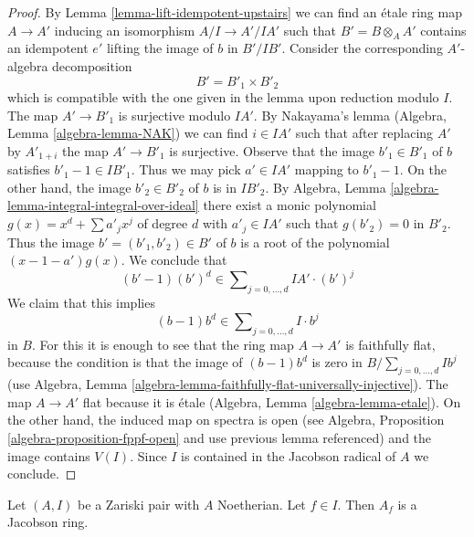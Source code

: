 \begin{proof}
By Lemma \ref{lemma-lift-idempotent-upstairs} we can find an
\'etale ring map $A \to A'$ inducing an isomorphism $A/I \to A'/IA'$
such that $B' = B \otimes_A A'$ contains
an idempotent $e'$ lifting the image of $b$ in $B'/IB'$.
Consider the corresponding $A'$-algebra decomposition
$$
B' = B'_1 \times B'_2
$$
which is compatible with the one given in the lemma upon
reduction modulo $I$.
The map $A' \to B'_1$ is surjective modulo $IA'$. By Nakayama's lemma
(Algebra, Lemma \ref{algebra-lemma-NAK})
we can find $i \in IA'$ such that after replacing $A'$
by $A'_{1 + i}$ the map $A' \to B'_1$ is surjective.
Observe that the image $b'_1 \in B'_1$ of $b$ 
satisfies $b'_1 - 1 \in IB'_1$.
Thus we may pick $a' \in IA'$ mapping to $b'_1 - 1$.
On the other hand, the image $b'_2 \in B'_2$ of $b$ is in $IB'_2$. By
Algebra, Lemma \ref{algebra-lemma-integral-integral-over-ideal}
there exist a monic polynomial
$g(x) = x^d + \sum a'_j x^j$ of degree $d$ with $a'_j \in IA'$ such that
$g(b'_2) = 0$ in $B'_2$. Thus the image $b' = (b'_1, b'_2) \in B'$
of $b$ is a root of the polynomial $(x - 1 - a')g(x)$. We conclude that
$$
(b' - 1)(b')^d \in \sum\nolimits_{j = 0, \ldots, d} IA' \cdot (b')^j
$$
We claim that this implies
$$
(b - 1)b^d \in \sum\nolimits_{j = 0, \ldots, d} I \cdot b^j
$$
in $B$. For this it is enough to see that the ring map
$A \to A'$ is faithfully flat, because the condition is that
the image of $(b - 1)b^d$ is zero in $B/\sum_{j = 0, \ldots, d} Ib^j$
(use Algebra, Lemma \ref{algebra-lemma-faithfully-flat-universally-injective}).
The map $A \to A'$ flat because it is \'etale
(Algebra, Lemma \ref{algebra-lemma-etale}).
On the other hand, the induced map on spectra is open
(see Algebra, Proposition \ref{algebra-proposition-fppf-open} and use
previous lemma referenced) and the image
contains $V(I)$. Since $I$ is contained in the Jacobson radical of $A$
we conclude.
\end{proof}

\begin{lemma}
\label{lemma-noetherian-zariski-jacobson-complement}
Let $(A, I)$ be a Zariski pair with $A$ Noetherian. Let $f \in I$.
Then $A_f$ is a Jacobson ring.
\end{lemma}

